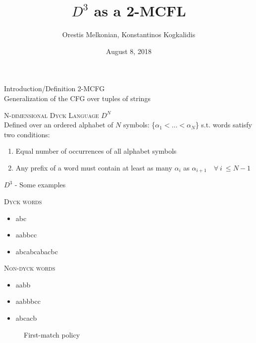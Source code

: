 \documentclass{beamer}
\title{$D^3$ as a 2-MCFL}
\subtitle{}
\author{Orestis Melkonian, Konstantinos Kogkalidis}
\date{August 8, 2018}
\institute{Utrecht University}
\newcommand\tsc[1]{\alert{\textsc{#1}}}
\begin{document}
	\maketitle

	\begin{frame}{Introduction/Definition}
		\tsc{2-MCFG}\\
			Generalization of the CFG over tuples of strings	
	
		\tsc{N-dimensional Dyck Language $D^N$}\\
			Defined over an ordered alphabet of $N$ symbols: \{$\alpha_1 < \dots < \alpha_N$\} s.t. words satisfy two conditions:
			\begin{enumerate}
				\item Equal number of occurrences of all alphabet symbols
				\item Any prefix of a word must contain at least as many $\alpha_i$ as $\alpha_{i+1} \quad \forall \ i \ \leq N-1$
			\end{enumerate}
	\end{frame}
	
	\begin{frame}{$D^3$ - Some examples}
		\hspace{1cm}
		\begin{minipage}{.4\textwidth}
		\textsc{Dyck words}
		\begin{itemize}
			\item \textcolor{ggreen}{abc}
			\item \textcolor{ggreen}{aabbcc}
			\item \textcolor{ggreen}{abcabcabacbc}
		\end{itemize}
		\end{minipage}
		\pause
		\begin{minipage}{.4\textwidth}
		\textsc{Non-dyck words}
		\begin{itemize}
			\item \textcolor{rred}{aabb}
			\pause
			\item \textcolor{rred}{aabbbcc}
			\pause
			\item \textcolor{rred}{abcacb}
		\end{itemize}
		\end{minipage}
		\vspace{1cm}
		\pause
		\begin{figure}[h!]
		\centering
		
		\caption*{First-match policy}
		\end{figure}
	\end{frame}
	
\end{document}
